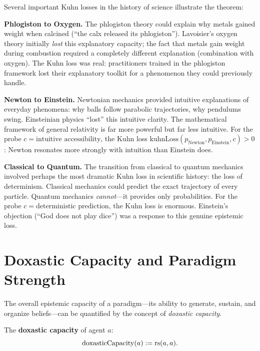 \begin{remark}
Several important Kuhn losses in the history of science illustrate the theorem:

\textbf{Phlogiston to Oxygen.} The phlogiston theory could explain why metals
gained weight when calcined (``the calx released its phlogiston''). Lavoisier's
oxygen theory initially \emph{lost} this explanatory capacity; the fact that
metals gain weight during combustion required a completely different explanation
(combination with oxygen). The Kuhn loss was real: practitioners trained in
the phlogiston framework lost their explanatory toolkit for a phenomenon they
could previously handle.

\textbf{Newton to Einstein.} Newtonian mechanics provided intuitive explanations
of everyday phenomena: why balls follow parabolic trajectories, why pendulums
swing. Einsteinian physics ``lost'' this intuitive clarity. The mathematical
framework of general relativity is far more powerful but far less intuitive.
For the probe $c = \text{intuitive accessibility}$, the Kuhn loss
$\mathrm{kuhnLoss}(p_{\text{Newton}}, p_{\text{Einstein}}, c) > 0$: Newton
resonates more strongly with intuition than Einstein does.

\textbf{Classical to Quantum.} The transition from classical to quantum mechanics
involved perhaps the most dramatic Kuhn loss in scientific history: the loss of
determinism. Classical mechanics could predict the exact trajectory of every
particle. Quantum mechanics \emph{cannot}---it provides only probabilities.
For the probe $c = \text{deterministic prediction}$, the Kuhn loss is enormous.
Einstein's objection (``God does not play dice'') was a response to this
genuine epistemic loss.
\end{remark}


\section{Doxastic Capacity and Paradigm Strength}

The overall epistemic capacity of a paradigm---its ability to generate, sustain,
and organize beliefs---can be quantified by the concept of \emph{doxastic capacity}.

\begin{definition}
\label{def:doxastic-capacity}
The \textbf{doxastic capacity} of agent $a$:
\[
  \mathrm{doxasticCapacity}(a) := \mathrm{rs}(a, a).
\]
\end{definition}

